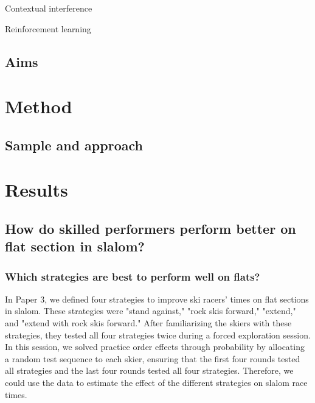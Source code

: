 \documentclass[letterpaper,10pt]{article}
\begin{document}
Contextual interference





Reinforcement learning





\subsection{Aims}




\section{Method}

\subsection{Sample and approach}


\section{Results}


\subsection{How do skilled performers perform better on flat section in slalom?}


\subsubsection{Which strategies are best to perform well on flats?}
In Paper 3, we defined four strategies to improve ski racers' times on flat sections in slalom. These strategies were "stand against," "rock skis forward," "extend," and "extend with rock skis forward." After familiarizing the skiers with these strategies, they tested all four strategies twice during a forced exploration session. In this session, we solved practice order effects through probability by allocating a random test sequence to each skier, ensuring that the first four rounds tested all strategies and the last four rounds tested all four strategies. Therefore, we could use the data to estimate the effect of the different strategies on slalom race times. 
\end{document}
